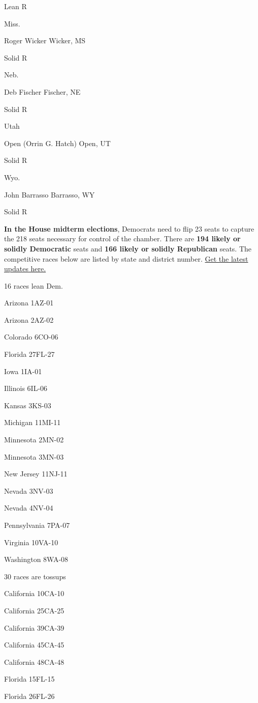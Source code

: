 Lean R

Miss.

Roger Wicker Wicker, MS

Solid R

Neb.

Deb Fischer Fischer, NE

Solid R

Utah

Open (Orrin G. Hatch) Open, UT

Solid R

Wyo.

John Barrasso Barrasso, WY

Solid R

\textbf{In the House midterm elections}, Democrats need to flip 23 seats
to capture the 218 seats necessary for control of the chamber. There are
\textbf{194 likely or solidly Democratic} seats and \textbf{166 likely
or solidly Republican} seats. The competitive races below are listed by
state and district number.
\href{https://www.nytimes3xbfgragh.onion/interactive/2018/us/elections/house-race-ratings.html}{Get
the latest updates here.}

16 races lean Dem.

Arizona 1AZ-01

Arizona 2AZ-02

Colorado 6CO-06

Florida 27FL-27

Iowa 1IA-01

Illinois 6IL-06

Kansas 3KS-03

Michigan 11MI-11

Minnesota 2MN-02

Minnesota 3MN-03

New Jersey 11NJ-11

Nevada 3NV-03

Nevada 4NV-04

Pennsylvania 7PA-07

Virginia 10VA-10

Washington 8WA-08

30 races are tossups

California 10CA-10

California 25CA-25

California 39CA-39

California 45CA-45

California 48CA-48

Florida 15FL-15

Florida 26FL-26

